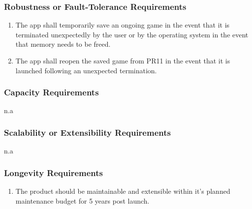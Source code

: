 \documentclass[]{article}
\begin{document}
\subsubsection{Robustness or Fault-Tolerance Requirements}
\label{ssub:robustness_or_fault_tolerance_requirements}
\begin{enumerate}[{PR}1. ]
	\resumeEnum
	\item The app shall temporarily save an ongoing game in the event that it is terminated unexpectedly by the user or by the operating system in the event that memory needs to be freed. 
	\item The app shall reopen the saved game from PR11 in the event that it is launched following an unexpected termination.
	\holdEnum
\end{enumerate}

\subsubsection{Capacity Requirements}
\label{ssub:capacity_requirements}
n.a

\subsubsection{Scalability or Extensibility Requirements}
\label{ssub:scalability_or_extensibility_requirements}
n.a

\subsubsection{Longevity Requirements}
\label{ssub:longevity_requirements}
\begin{enumerate}[{PR}1. ]
	\resumeEnum
	\item The product should be maintainable and extensible within it's planned maintenance budget for 5 years post launch.
\end{enumerate}

\end{document}
